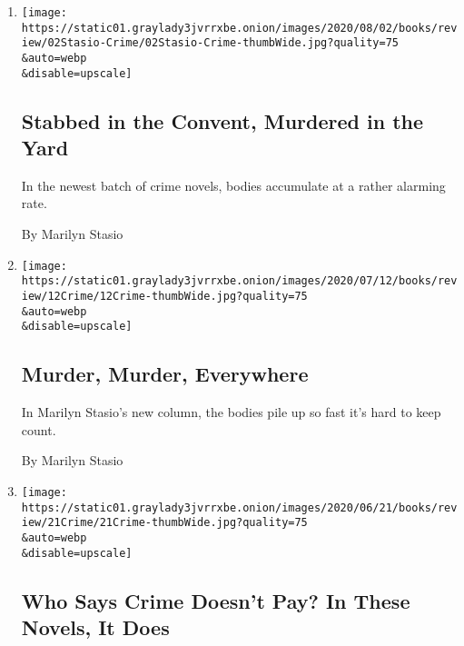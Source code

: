\begin{enumerate}
\def\labelenumi{\arabic{enumi}.}
\item
  \href{/2020/07/31/books/review/crime-fiction-megan-miranda.html}{}

  \texttt{[image: https://static01.graylady3jvrrxbe.onion/images/2020/08/02/books/review/02Stasio-Crime/02Stasio-Crime-thumbWide.jpg?quality=75\\\&auto=webp\\\&disable=upscale]}

  \hypertarget{stabbed-in-the-convent-murdered-in-the-yard}{%
  \subsection{Stabbed in the Convent, Murdered in the
  Yard}\label{stabbed-in-the-convent-murdered-in-the-yard}}

  In the newest batch of crime novels, bodies accumulate at a rather
  alarming rate.

  By Marilyn Stasio
\item
  \href{/2020/07/10/books/review/crime-fiction-jessica-barry-dont-turn-around.html}{}

  \texttt{[image: https://static01.graylady3jvrrxbe.onion/images/2020/07/12/books/review/12Crime/12Crime-thumbWide.jpg?quality=75\\\&auto=webp\\\&disable=upscale]}

  \hypertarget{murder-murder-everywhere}{%
  \subsection{Murder, Murder,
  Everywhere}\label{murder-murder-everywhere}}

  In Marilyn Stasio's new column, the bodies pile up so fast it's hard
  to keep count.

  By Marilyn Stasio
\item
  \href{/2020/06/18/books/review/crime-fiction-james-lee-burke-jeffery-deaver.html}{}

  \texttt{[image: https://static01.graylady3jvrrxbe.onion/images/2020/06/21/books/review/21Crime/21Crime-thumbWide.jpg?quality=75\\\&auto=webp\\\&disable=upscale]}

  \hypertarget{who-says-crime-doesnt-pay-in-these-novels-it-does}{%
  \subsection{Who Says Crime Doesn't Pay? In These Novels, It
  Does}\label{who-says-crime-doesnt-pay-in-these-novels-it-does}}


\end{enumerate}
